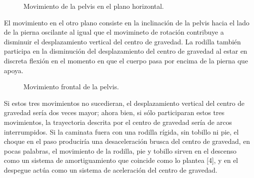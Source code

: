   
\begin{figure}
	\centering
	\caption{Movimiento de la pelvis en el plano horizontal.}
	\label{fig:tres}
\end{figure}

  
  El movimiento en el otro plano consiste en la inclinación de la pelvis hacia el lado de la pierna oscilante al igual que el movimineto de rotación contribuye a disminuir el desplazamiento vertical del centro de gravedad. La rodilla también participa en la disminución del desplazamiento del centro de gravedad al estar en discreta flexión en el momento en que el cuerpo pasa por encima de la pierna que apoya.\\
  
  
\begin{figure}[h]
	\centering
	
	\caption{Movimiento frontal de la pelvis.}
	\label{fig:cuatro}
\end{figure}

  
  Si estos tres movimientos no sucedieran, el desplazamiento vertical del centro de gravedad sería dos veces mayor; ahora bien, si sólo participaran estos tres movimientos, la trayectoria descrita por el centro de gravedad sería de arcos interrumpidos. Si la caminata fuera con una rodilla rígida, sin tobillo ni pie, el choque en el paso produciría una desaceleración brusca del centro de gravedad, en pocas palabras, el movimiento  de la rodilla, pie y tobillo sirven en el descenso como un sistema de amortiguamiento que coincide como lo plantea [4], y en el despegue actúa como un sistema de aceleración del centro de gravedad.             
  